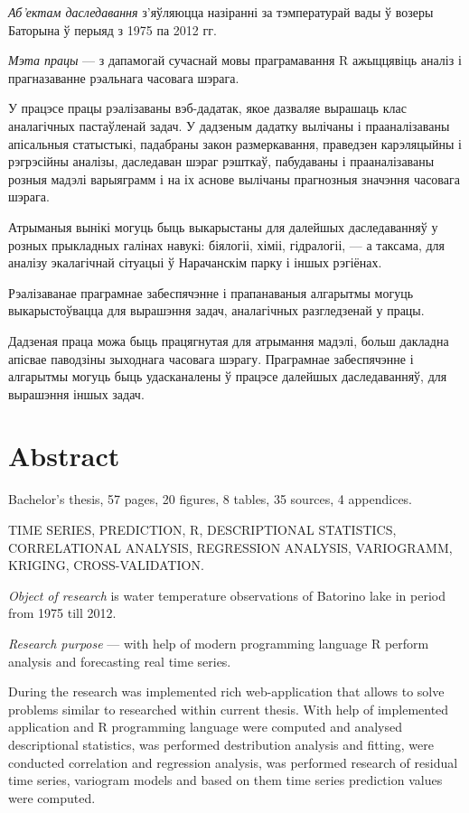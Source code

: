 \textit{Аб'ектам даследавання} з'яўляюцца назіранні за тэмпературай вады ў возеры Баторына ў перыяд з 1975 па 2012 гг.

\textit{Мэта працы} --- з дапамогай сучаснай мовы праграмавання R ажыццявіць аналіз і прагназаванне рэальнага часовага шэрага.

У працэсе працы рэалізаваны вэб-дадатак, якое дазваляе вырашаць клас аналагічных пастаўленай задач. У дадзеным дадатку вылічаны і прааналізаваны апісальныя статыстыкі, падабраны закон размеркавання, праведзен карэляцыйны і рэгрэсійны аналізы, даследаван шэраг рэшткаў, пабудаваны і прааналізаваны розныя мадэлі варыяграмм і на іх аснове вылічаны прагнозныя значэння часовага шэрага.

Атрыманыя вынікі могуць быць выкарыстаны для далейшых даследаванняў у розных прыкладных галінах навукі: біялогіі, хіміі, гідралогіі, --- а таксама, для аналізу экалагічнай сітуацыі ў Нарачанскім парку і іншых рэгіёнах.

Рэалізаванае праграмнае забеспячэнне і прапанаваныя алгарытмы могуць выкарыстоўвацца для вырашэння задач, аналагічных разгледзенай у працы.

Дадзеная праца можа быць працягнутая для атрымання мадэлі, больш дакладна апісвае паводзіны зыходнага часовага шэрагу. Праграмнае забеспячэнне і алгарытмы могуць быць удасканалены ў працэсе далейшых даследаванняў, для вырашэння іншых задач.

\newpage

\chapter*{Abstract}
Bachelor's thesis, 57 pages, 20 figures, 8 tables, 35 sources, 4 appendices.

TIME SERIES, PREDICTION, R, DESCRIPTIONAL STATISTICS, CORRELATIONAL ANALYSIS, REGRESSION ANALYSIS, VARIOGRAMM, KRIGING, CROSS-VALIDATION\@.

\textit{Object of research} is water temperature observations of Batorino lake in period from 1975 till 2012.

\textit{Research purpose} --- with help of modern programming language R perform analysis and forecasting real time series.

During the research was implemented rich web-application that allows to solve problems similar to researched within current thesis. With help of implemented application and R programming language were computed and analysed descriptional statistics, was performed destribution analysis and fitting, were conducted correlation and regression analysis, was performed research of residual time series, variogram models and based on them time series prediction values were computed.


